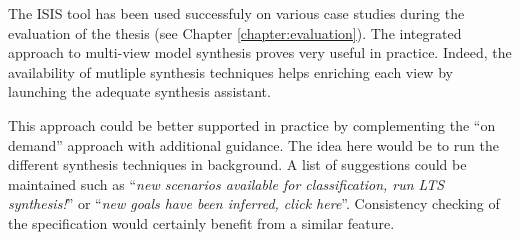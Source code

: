 The ISIS tool has been used successfuly on various case studies during the evaluation of the thesis (see Chapter \ref{chapter:evaluation}). The integrated approach to multi-view model synthesis proves very useful in practice. Indeed, the availability of mutliple synthesis techniques helps enriching each view by launching the adequate synthesis assistant.

This approach could be better supported in practice by complementing the ``on demand'' approach with additional guidance. The idea here would be to run the different synthesis techniques in background. A list of suggestions could be maintained such as ``\emph{new scenarios available for classification, run LTS synthesis!}'' or ``\emph{new goals have been inferred, click here}''. Consistency checking of the specification would certainly benefit from a similar feature.


